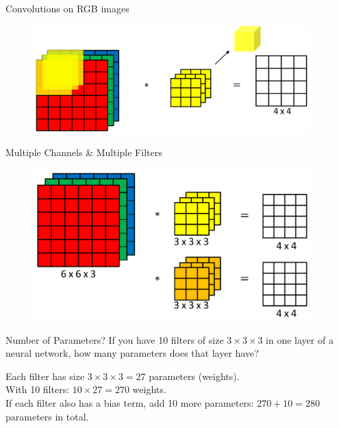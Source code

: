 \begin{frame}[allowframebreaks]{Convolutions on RGB images}
    \begin{figure}
    \centering
    \includegraphics[width=0.95\textwidth,height=0.95\textheight,keepaspectratio]{images/cnn/rgb-convolution.png}
    \end{figure}
\end{frame}

\begin{frame}[allowframebreaks]{Multiple Channels \& Multiple Filters}
    \begin{figure}
    \centering
    \includegraphics[width=0.95\textwidth,height=0.95\textheight,keepaspectratio]{images/cnn/mutiple-filters.png}
    \end{figure}
\end{frame}

\begin{frame}[allowframebreaks]{Number of Parameters?}
    \LARGE If you have 10 filters of size $3 \times 3 \times 3$ in one layer of a neural network, how many parameters does that layer have?

\framebreak
    Each filter has size $3 \times 3 \times 3 = 27$ parameters (weights).  \\[2em]
    With 10 filters: $10 \times 27 = 270$ weights.  \\[2em]
    If each filter also has a bias term, add 10 more parameters: \textbf{$270 + 10 = 280$} parameters in total.
\end{frame}